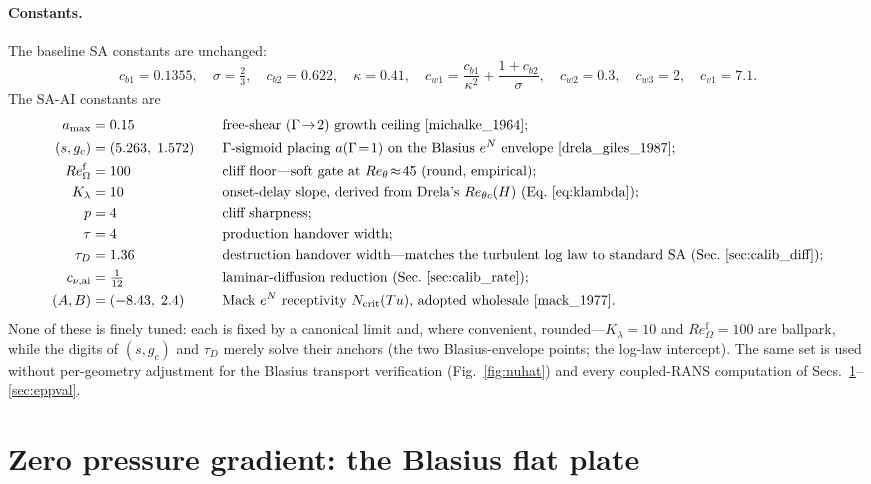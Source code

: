 \documentclass[journal]{new-aiaa}
\begin{document}
\paragraph{Constants.} The baseline SA constants are unchanged:
\begin{equation*}
  c_{b1}=0.1355,\quad \sigma=\tfrac{2}{3},\quad c_{b2}=0.622,\quad
  \kappa=0.41,\quad c_{w1}=\frac{c_{b1}}{\kappa^2}+\frac{1+c_{b2}}{\sigma},\quad
  c_{w2}=0.3,\quad c_{w3}=2,\quad c_{v1}=7.1 .
\end{equation*}
The SA-AI constants are
\begin{equation*}
  \begin{aligned}
    a_{\max}&=0.15 &\quad&\text{free-shear ($\Gamma\!\to\!2$) growth ceiling \cite{michalke_1964};}\\
    (s,g_c)&=(5.263,\;1.572) &&\text{$\Gamma$-sigmoid placing $a(\Gamma\!=\!1)$ on the Blasius $e^N$ envelope \cite{drela_giles_1987};}\\
    Re_\Omega^{\mathrm{f}}&=100 &&\text{cliff floor---soft gate at $Re_\theta\!\approx\!45$ (round, empirical);}\\
    K_\lambda&=10 &&\text{onset-delay slope, derived from Drela's $Re_{\theta c}(H)$ (Eq.~\eqref{eq:klambda});}\\
    p&=4 &&\text{cliff sharpness;}\\
    \tau&=4 &&\text{production handover width;}\\
    \tau_D&=1.36 &&\text{destruction handover width---matches the turbulent log law to standard SA (Sec.~\ref{sec:calib_diff});}\\
    c_{\nu,\mathrm{ai}}&=\tfrac{1}{12} &&\text{laminar-diffusion reduction (Sec.~\ref{sec:calib_rate});}\\
    (A,B)&=(-8.43,\;2.4) &&\text{Mack $e^N$ receptivity $N_\mathrm{crit}(Tu)$, adopted wholesale \cite{mack_1977}.}
  \end{aligned}
\end{equation*}
None of these is finely tuned: each is fixed by a canonical limit and, where
convenient, rounded---$K_\lambda\!=\!10$ and $Re_\Omega^{\mathrm{f}}\!=\!100$ are
ballpark, while the digits of $(s,g_c)$ and $\tau_D$ merely solve their
anchors (the two Blasius-envelope points; the log-law intercept). The
same set is used without per-geometry adjustment for the Blasius transport
verification (Fig.~\ref{fig:nuhat}) and every coupled-RANS computation of
Secs.~\ref{sec:flatplate}--\ref{sec:eppval}.

\section{Zero pressure gradient: the Blasius flat plate}\label{sec:flatplate}
\end{document}
